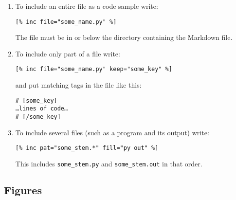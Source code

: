 \documentclass{scrbook}
\begin{document}
\begin{enumerate}

\item 

To include an entire file as a code sample write:

\begin{lstlisting}[frame=single,frameround=tttt]
[% inc file="some_name.py" %]
\end{lstlisting}


The file must be in or below the directory containing the Markdown file.



\item 

To include only part of a file write:

\begin{lstlisting}[frame=single,frameround=tttt]
[% inc file="some_name.py" keep="some_key" %]
\end{lstlisting}


and put matching tags in the file like this:

\begin{lstlisting}[frame=single,frameround=tttt]
# [some_key]
…lines of code…
# [/some_key]
\end{lstlisting}



\item 

To include several files (such as a program and its output) write:

\begin{lstlisting}[frame=single,frameround=tttt]
[% inc pat="some_stem.*" fill="py out" %]
\end{lstlisting}


This includes \texttt{some\_stem.py} and \texttt{some\_stem.out} in that order.



\end{enumerate}

\subsection*{Figures}
\end{document}
